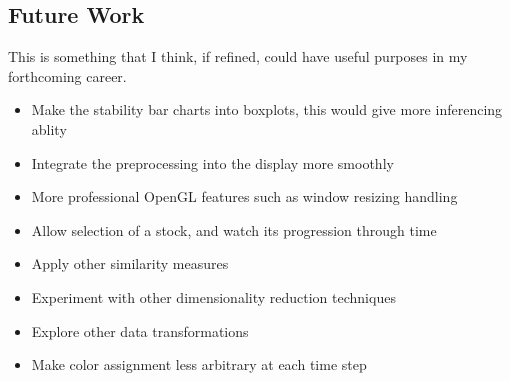 \documentclass{article}
\begin{document}
\begin{multicols}{2}
\section{Future Work}
This is something that I think, if refined, could have useful purposes in my forthcoming career.
\begin{itemize}
 \item Make the stability bar charts into boxplots, this would give more inferencing ablity
 \item Integrate the preprocessing into the display more smoothly
 \item More professional OpenGL features such as window resizing handling
 \item Allow selection of a stock, and watch its progression through time
 \item Apply other similarity measures
 \item Experiment with other dimensionality reduction techniques
 \item Explore other data transformations
 \item Make color assignment less arbitrary at each time step
\end{itemize}


\end{multicols}
\end{document}
